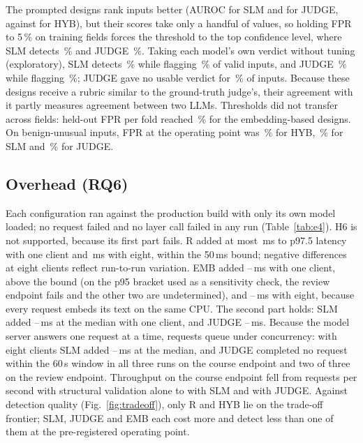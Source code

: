 \documentclass[conference]{IEEEtran}
\begin{document}
The prompted designs rank inputs better (AUROC  for SLM and  for
JUDGE, against  for HYB), but their scores take only a handful of values, so holding
FPR to 5\,\% on training fields forces the threshold to the top confidence level, where SLM detects
\,\% and JUDGE \,\%. Taking each model's own verdict without tuning
(exploratory), SLM detects \,\% while flagging \,\% of valid inputs,
and JUDGE \,\% while flagging \,\%; JUDGE gave no usable verdict
for \,\% of inputs. Because these designs receive a rubric similar to the
ground-truth judge's, their agreement with it partly measures agreement between two LLMs. Thresholds
did not transfer across fields: held-out FPR per fold reached \,\% for the
embedding-based designs. On benign-unusual inputs, FPR at the operating point was
\,\% for HYB, \,\% for SLM and \,\% for JUDGE.

\subsection{Overhead (RQ6)}

Each configuration ran against the production build with only its own model loaded; no request
failed and no layer call failed in any run (Table~\ref{tab:e4}). H6 is not supported, because its
first part fails. R added at most \,ms to p97.5 latency with one client and
\,ms with eight, within the 50\,ms bound; negative differences at eight clients
reflect run-to-run variation. EMB added --\,ms with one
client, above the bound (on the p95 bracket used as a sensitivity check, the review endpoint fails
and the other two are undetermined), and --\,ms with eight, because every
request embeds its text on the same CPU. The second part holds: SLM added
--\,ms at the median with one client, and JUDGE
--\,ms. Because the model server answers one
request at a time, requests queue under concurrency: with eight clients SLM added
--\,ms at the median, and JUDGE completed no request
within the 60\,s window in all three runs on the course endpoint and two of three on the review
endpoint. Throughput on the course endpoint fell from  requests per
second with structural validation alone to  with SLM and
 with JUDGE. Against detection quality (Fig.~\ref{fig:tradeoff}), only R
and HYB lie on the trade-off frontier; SLM, JUDGE and EMB each cost more and detect less than one of them
at the pre-registered operating point.
\end{document}
